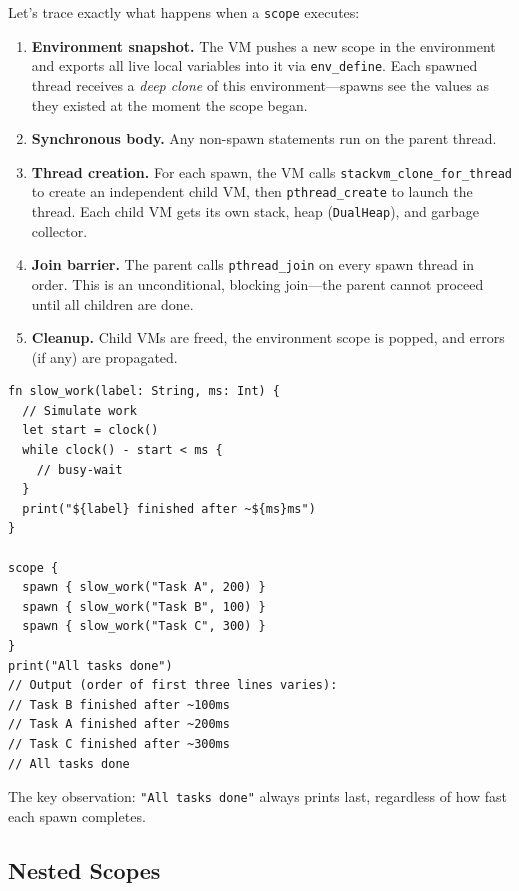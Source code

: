 
Let's trace exactly what happens when a \lstinline|scope| executes:

\begin{enumerate}
  \item \textbf{Environment snapshot.} The VM pushes a new scope in the environment and exports all live local variables into it via \texttt{env\_define}. Each spawned thread receives a \emph{deep clone} of this environment---spawns see the values as they existed at the moment the scope began.
  \item \textbf{Synchronous body.} Any non-spawn statements run on the parent thread.
  \item \textbf{Thread creation.} For each spawn, the VM calls \texttt{stackvm\_clone\_for\_thread} to create an independent child VM, then \texttt{pthread\_create} to launch the thread. Each child VM gets its own stack, heap (\texttt{DualHeap}), and garbage collector.
  \item \textbf{Join barrier.} The parent calls \texttt{pthread\_join} on every spawn thread in order. This is an unconditional, blocking join---the parent cannot proceed until all children are done.
  \item \textbf{Cleanup.} Child VMs are freed, the environment scope is popped, and errors (if any) are propagated.
\end{enumerate}

\begin{lstlisting}[language=Lattice, caption={Demonstrating join semantics with timing}]
fn slow_work(label: String, ms: Int) {
  // Simulate work
  let start = clock()
  while clock() - start < ms {
    // busy-wait
  }
  print("${label} finished after ~${ms}ms")
}

scope {
  spawn { slow_work("Task A", 200) }
  spawn { slow_work("Task B", 100) }
  spawn { slow_work("Task C", 300) }
}
print("All tasks done")
// Output (order of first three lines varies):
// Task B finished after ~100ms
// Task A finished after ~200ms
// Task C finished after ~300ms
// All tasks done
\end{lstlisting}

The key observation: \lstinline|"All tasks done"| always prints last, regardless of how fast each spawn completes.

\subsection{Nested Scopes}

